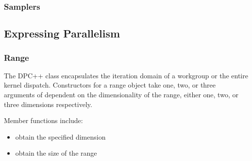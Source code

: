 \documentclass[letterpaper,10pt,english]{sphinxmanual}
\begin{document}
\begin{fulllineitems}
\pysigstopmultiline{}\label{\detokenize{programming-interface/data/multi-pointer:_CPPv4I0E11private_ptr}}%
\pysigstartmultiline
{}%
\pysigstopmultiline
\end{fulllineitems}



\subsubsection{Samplers}
\label{\detokenize{programming-interface/data/sampler:samplers}}\label{\detokenize{programming-interface/data/sampler::doc}}

\subsection{Expressing Parallelism}
\label{\detokenize{programming-interface/parallelism/index:expressing-parallelism}}\label{\detokenize{programming-interface/parallelism/index::doc}}

\subsubsection{Range}
\label{\detokenize{programming-interface/parallelism/range:range}}\label{\detokenize{programming-interface/parallelism/range:id1}}\label{\detokenize{programming-interface/parallelism/range::doc}}
The DPC++  class encapsulates the iteration domain of a
work\sphinxhyphen{}group or the entire kernel dispatch. Constructors for a range
object take one, two, or three arguments of  dependent on the
dimensionality of the range, either one, two, or three dimensions
respectively.

Member functions include:
\begin{itemize}
\item {} 
 \textendash{} obtain the specified dimension

\item {} 
 \textendash{} obtain the size of the range

\end{itemize}
\end{document}

